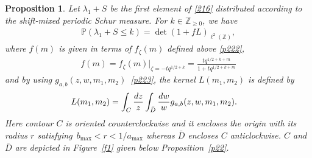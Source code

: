 \documentclass[11pt]{article}
\numberwithin{equation}{section}
\numberwithin{equation}{section}
\newtheorem{Proposition}[Theorem]{Proposition}
 { \theoremstyle{definition}
\newtheorem{Definition}[Theorem]{Definition}
\newtheorem{Note}[Theorem]{Note}
\newtheorem{Example}[Theorem]{Example}
\newtheorem{Remark}[Theorem]{Remark} }
\def\l{\lambda}
\def\P{\mathbb{P}}
\def\Z{\mathbb{Z}}
\begin{document}
\begin{Proposition}\label{p25}
 Let $\l_1+S$ be the first element of \eqref{216} distributed according to the shift-mixed periodic Schur measure.
 For $k\in\Z_{\ge 0}$, we have
\begin{align} \label{p251}
 \P (\l_1+S\le k )
 =\det (1+f L )_{\ell^2(\Z)},
\end{align}
 where
 $f(m)$ is given in terms of
 $f_{\zeta}(m)$ defined above \eqref{p222},
\begin{align}
\label{p251-1}
 f(m)=f_{\zeta}(m)|_{\zeta=-tq^{1/2+k}}
 =\frac{tq^{1/2+k+m}}{1+tq^{1/2+k+m}}
\end{align}
and
by using $g_{a,b}(z,w,m_1,m_2)$~\eqref{p223},
the kernel
$L(m_1,m_2)$ is defined by
\begin{align}
&L(m_1,m_2)=
\int_C\frac{{\rm d}z}{z}\int_{\bar{D}}\frac{{\rm d}w}{w}
g_{a,b}(z,w,m_1,m_2).
\label{t252}
\end{align}
Here contour $C$ is oriented counterclockwise and it encloses the origin with its radius
$r$ satisfying~${b_{\max}<r<1/a_{\max}}$
whereas $\bar{D}$ encloses $C$
anticlockwise.
$C$ and $\bar{D}$ are depicted in Figure~{\rm\ref{f1}}
given below Proposition~{\rm\ref{p22}}.

\end{Proposition}
\end{document}
